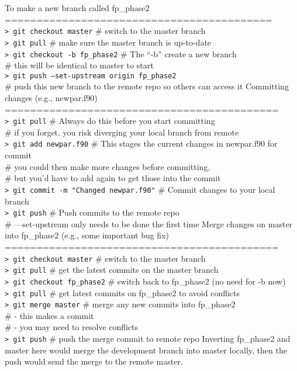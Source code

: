 To make a new branch called fp\_phase2
\\==========================================
\\\texttt{> git checkout master} \# switch to the master branch
\\\texttt{> git pull}  \# make sure the master branch is up-to-date
\\\texttt{> git checkout -b fp\_phase2} \# The ``-b'' create a new branch
\\\#   this will be identical to master to start
\\\texttt{> git push --set-upstream origin fp\_phase2} 
\\\# push this new branch to the remote repo so others can access it
\newline\newline
Committing changes (e.g., newpar.f90)
\\===========================================
\\
\texttt{> git pull}                           \# Always do this before you start committing
\\\#   if you forget, you risk diverging your local branch from remote
\\
\texttt{> git add newpar.f90} \# This stages the current changes in newpar.f90 for commit
\\\#   you could then make more changes before committing,
\\\#   but you'd have to add again to get those into the commit
\\
\texttt{> git commit -m "Changed newpar.f90"} \# Commit changes to your local branch 
\\
\texttt{> git push}                           \# Push commits to the remote repo
\\\#   ---set-upstream only needs to be done the first time
\newline\newline
Merge changes on master into fp\_phase2 (e.g., some important bug fix)
\\===========================================
\\\texttt{> git checkout master}    \# switch to the master branch
\\\texttt{> git pull}               \# get the latest commits on the master branch
\\\texttt{> git checkout fp\_phase2} \# switch back to fp\_phase2 (no need for -b now)
\\\texttt{> git pull}               \# get latest commits on fp\_phase2 to avoid conflicts
\\\texttt{> git merge master}       \# merge any new commits into fp\_phase2
\\\#  - this makes a commit
\\\#  - you may need to resolve conflicts
\\\texttt{> git push}               \# push the merge commit to remote repo
\newline\newline
Inverting fp\_phase2 and master here would merge the development branch into master locally, then the push would send the merge to the remote master.

